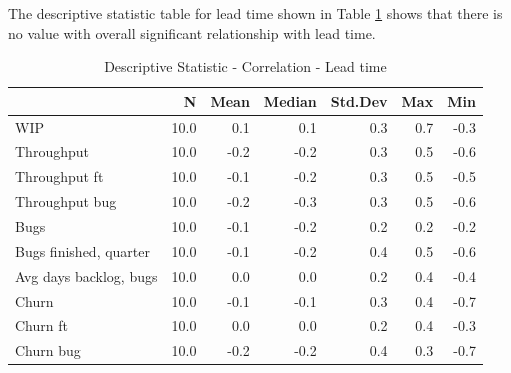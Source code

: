 \documentclass[UKenglish]{ifimaster}  %
\begin{document}
The descriptive statistic table for lead time shown in Table \ref{DS:corr:LT} shows that there is no value with overall significant relationship with lead time. 
\begin{table}[!htbp]
 \centering
 \begin{tabular}{ | l | r | r | r | r | r | r | }
 \hline
 & \bf{N} & \bf{Mean} & \bf{Median} & \bf{Std.Dev} & \bf{Max} & \bf{Min} \\ \hline
 
WIP  & 10.0 & 0.1 & 0.1 & 0.3 & 0.7 & -0.3\\ \hline
Throughput  & 10.0 & -0.2 & -0.2 & 0.3 & 0.5 & -0.6\\ \hline
Throughput ft  & 10.0 & -0.1 & -0.2 & 0.3 & 0.5 & -0.5\\ \hline
Throughput bug  & 10.0 & -0.2 & -0.3 & 0.3 & 0.5 & -0.6\\ \hline
Bugs  & 10.0 & -0.1 & -0.2 & 0.2 & 0.2 & -0.2\\ \hline
Bugs finished, quarter  & 10.0 & -0.1 & -0.2 & 0.4 & 0.5 & -0.6\\ \hline
Avg days backlog, bugs  & 10.0 & 0.0 & 0.0 & 0.2 & 0.4 & -0.4\\ \hline
Churn  & 10.0 & -0.1 & -0.1 & 0.3 & 0.4 & -0.7\\ \hline
Churn ft  & 10.0 & 0.0 & 0.0 & 0.2 & 0.4 & -0.3\\ \hline
Churn bug  & 10.0 & -0.2 & -0.2 & 0.4 & 0.3 & -0.7\\ \hline
\end{tabular}
 \caption{Descriptive Statistic - Correlation - Lead time}
 \label{DS:corr:LT}
 \end{table}
\end{document}
